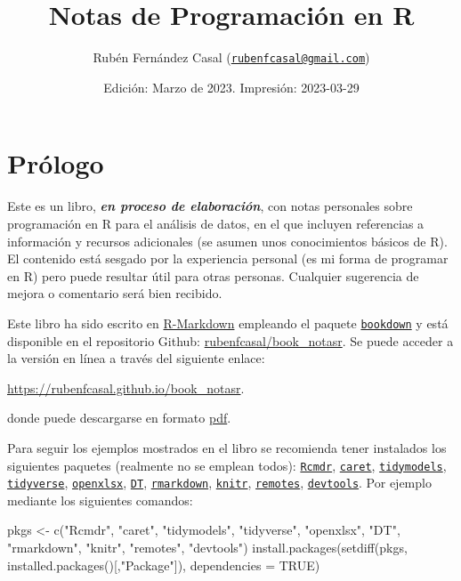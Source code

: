 \documentclass[
]{book}
\title{Notas de Programación en R}
\author{Rubén Fernández Casal (\href{mailto:rubenfcasal@gmail.com}{\nolinkurl{rubenfcasal@gmail.com}})}
\date{Edición: Marzo de 2023. Impresión: 2023-03-29}
\newenvironment{Shaded}{\begin{snugshade}}{\end{snugshade}}
\newcommand{\AttributeTok}[1]{\textcolor[rgb]{0.77,0.63,0.00}{#1}}
\newcommand{\ConstantTok}[1]{\textcolor[rgb]{0.00,0.00,0.00}{#1}}
\newcommand{\FunctionTok}[1]{\textcolor[rgb]{0.00,0.00,0.00}{#1}}
\newcommand{\NormalTok}[1]{#1}
\newcommand{\OtherTok}[1]{\textcolor[rgb]{0.56,0.35,0.01}{#1}}
\newcommand{\StringTok}[1]{\textcolor[rgb]{0.31,0.60,0.02}{#1}}
\theoremstyle{break}
\theoremstyle{nonumberplain}
\begin{document}
\maketitle

{
\setcounter{tocdepth}{1}
\tableofcontents
}
\hypertarget{pruxf3logo}{%
\chapter*{Prólogo}\label{pruxf3logo}}

Este es un libro, \textbf{\emph{en proceso de elaboración}}, con notas personales sobre programación en R para el análisis de datos, en el que incluyen referencias a información y recursos adicionales (se asumen unos conocimientos básicos de R).
El contenido está sesgado por la experiencia personal (es mi forma de programar en R) pero puede resultar útil para otras personas.
Cualquier sugerencia de mejora o comentario será bien recibido.

Este libro ha sido escrito en \href{http://rmarkdown.rstudio.com}{R-Markdown} empleando el paquete \href{https://bookdown.org/yihui/bookdown/}{\texttt{bookdown}} y está disponible en el repositorio Github: \href{https://github.com/rubenfcasal/book_notasr}{rubenfcasal/book\_notasr}.
Se puede acceder a la versión en línea a través del siguiente enlace:

\url{https://rubenfcasal.github.io/book_notasr}.

donde puede descargarse en formato \href{https://rubenfcasal.github.io/book_notasr/Notas_R.pdf}{pdf}.

Para seguir los ejemplos mostrados en el libro se recomienda tener instalados los siguientes paquetes (realmente no se emplean todos):
\href{https://www.r-project.org}{\texttt{Rcmdr}}, \href{https://github.com/topepo/caret/}{\texttt{caret}}, \href{https://tidymodels.tidymodels.org}{\texttt{tidymodels}}, \href{https://tidyverse.tidyverse.org}{\texttt{tidyverse}}, \href{https://ycphs.github.io/openxlsx/index.html}{\texttt{openxlsx}}, \href{https://github.com/rstudio/DT}{\texttt{DT}}, \href{https://github.com/rstudio/rmarkdown}{\texttt{rmarkdown}}, \href{https://yihui.org/knitr/}{\texttt{knitr}}, \href{https://remotes.r-lib.org}{\texttt{remotes}}, \href{https://devtools.r-lib.org/}{\texttt{devtools}}.
Por ejemplo mediante los siguientes comandos:

\begin{Shaded}
\begin{Highlighting}[]
\NormalTok{pkgs }\OtherTok{\textless{}{-}} \FunctionTok{c}\NormalTok{(}\StringTok{"Rcmdr"}\NormalTok{, }\StringTok{"caret"}\NormalTok{, }\StringTok{"tidymodels"}\NormalTok{, }\StringTok{"tidyverse"}\NormalTok{, }\StringTok{"openxlsx"}\NormalTok{, }\StringTok{"DT"}\NormalTok{, }
          \StringTok{"rmarkdown"}\NormalTok{, }\StringTok{"knitr"}\NormalTok{, }\StringTok{"remotes"}\NormalTok{, }\StringTok{"devtools"}\NormalTok{)}
\FunctionTok{install.packages}\NormalTok{(}\FunctionTok{setdiff}\NormalTok{(pkgs, }\FunctionTok{installed.packages}\NormalTok{()[,}\StringTok{"Package"}\NormalTok{]), }\AttributeTok{dependencies =} \ConstantTok{TRUE}\NormalTok{)}
\end{Highlighting}
\end{Shaded}
\end{document}
